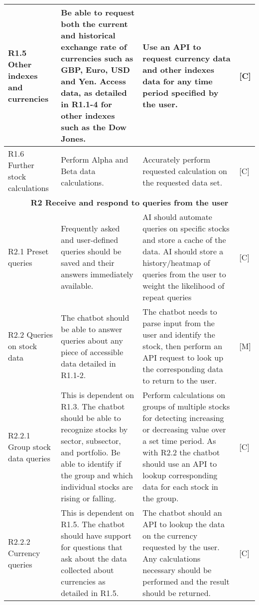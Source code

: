 \documentclass[9pt]{article} %
\begin{document}
\begin{center}
\begin{longtable}{ | m{3cm} | m{7cm} | m{7cm} | m{0.5cm} | }
 		\hline
 		
		R1.5 Other indexes and currencies  & 
		Be able to request both the current and historical exchange rate of currencies such as GBP, Euro, USD and Yen. Access data, as detailed in R1.1-4 for other indexes such as the Dow Jones. &
		Use an API to request currency data and other indexes data for any time period specified by the user. & 
		[C] \\

		\hline
		
		R1.6 Further stock calculations & 
		Perform Alpha and Beta data calculations. & 
		Accurately perform requested calculation on the requested data set. & 
		[C] \\

		\hline

		\multicolumn{4}{|c|}{\textbf{R2 Receive and respond to queries from the user}} \\
	
		\hline
	
		R2.1 Preset queries  & 
		Frequently asked and user-defined queries should be saved and their answers immediately available. &
		AI should automate queries on specific stocks and store a cache of the data. AI should store a history/heatmap of queries from the user to weight the likelihood of repeat queries & 
		[C] \\
	
		\hline
	
		R2.2 Queries on stock data & 
		The chatbot should be able to answer queries about any piece of accessible data detailed in R1.1-2. & 
		The chatbot needs to parse input from the user and identify the stock, then perform an API request to look up the corresponding data to return to the user. & 
		[M] \\
		
		\hline
		
		R2.2.1 Group stock data queries & 
		This is dependent on R1.3. The chatbot should be able to recognize stocks by sector, subsector, and portfolio. Be able to identify if the group and which individual stocks are rising or falling. &
		Perform calculations on groups of multiple stocks for detecting increasing or decreasing value over a set time period. As with R2.2 the chatbot should use an API to lookup corresponding data for each stock in the group. & 
		[C] \\
		
		\hline

		R2.2.2 Currency queries & 
		This is dependent on R1.5. The chatbot should have support for questions that ask about the data collected about currencies as detailed in R1.5. & 
		The chatbot should an API to lookup the data on the currency requested by the user. Any calculations necessary should be performed and the result should be returned. &
		[C] \\
		

\end{longtable}
\end{center}
\end{document}
